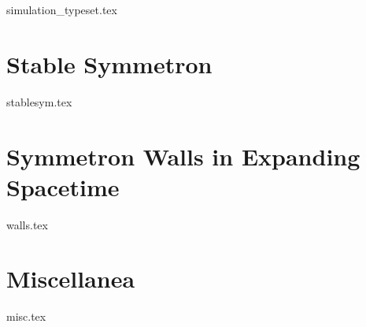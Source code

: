 \documentclass[UKenglish]{texmex/uiomasterthesis}
\begin{document}
{{simulation_typeset.tex}
\chapter{Stable Symmetron}\label{app:stablesym}
    {{stablesym.tex}}

\chapter{Symmetron Walls in Expanding Spacetime}\label{app:walls}
    {{walls.tex}}


\chapter{Miscellanea}\label{app:misc}
    {{misc.tex}}
}





    





\end{document}
